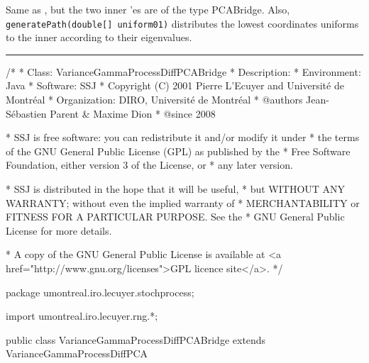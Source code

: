 
Same as , but the two
inner 'es are of the type PCABridge.
Also, \texttt{generatePath(double[] uniform01)} distributes the
lowest coordinates uniforms to the inner
 according to their eigenvalues.

\bigskip\hrule\bigskip

\begin{code}
\begin{hide}
/*
 * Class:        VarianceGammaProcessDiffPCABridge
 * Description:  
 * Environment:  Java
 * Software:     SSJ 
 * Copyright (C) 2001  Pierre L'Ecuyer and Université de Montréal
 * Organization: DIRO, Université de Montréal
 * @authors      Jean-Sébastien Parent & Maxime Dion
 * @since        2008

 * SSJ is free software: you can redistribute it and/or modify it under
 * the terms of the GNU General Public License (GPL) as published by the
 * Free Software Foundation, either version 3 of the License, or
 * any later version.

 * SSJ is distributed in the hope that it will be useful,
 * but WITHOUT ANY WARRANTY; without even the implied warranty of
 * MERCHANTABILITY or FITNESS FOR A PARTICULAR PURPOSE.  See the
 * GNU General Public License for more details.

 * A copy of the GNU General Public License is available at
   <a href="http://www.gnu.org/licenses">GPL licence site</a>.
 */
\end{hide}
package umontreal.iro.lecuyer.stochprocess;\begin{hide}
import umontreal.iro.lecuyer.rng.*;

\end{hide}

public class VarianceGammaProcessDiffPCABridge extends
                                               VarianceGammaProcessDiffPCA \begin{hide} {

\end{hide}
\end{code}
